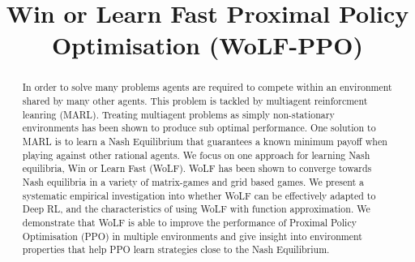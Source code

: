 \documentclass[conference]{IEEEtran}
\begin{document}
\setlength{\intextsep}{0.5ex}

\title{Win or Learn Fast Proximal Policy Optimisation (WoLF-PPO)}

\author{
\and
{}
\and
{}
}

\maketitle

\begin{abstract}
    In order to solve many problems agents are required to compete within an environment shared by many other agents. This problem is tackled by multiagent reinforcment leanring (MARL). Treating multiagent problems as simply non-stationary environments has been shown to produce sub optimal performance. One solution to MARL is to learn a Nash Equilibrium that guarantees a known minimum payoff when playing against other rational agents. We focus on one approach for learning Nash equilibria, Win or Learn Fast (WoLF). WoLF has been shown to converge towards Nash equilibria in a variety of matrix-games and grid based games. We present a systematic empirical investigation into whether WoLF can be effectively adapted to Deep RL, and the characteristics of using WoLF with function approximation. We demonstrate that WoLF is able to improve the performance of Proximal Policy Optimisation (PPO) in multiple environments and give insight into environment properties that help PPO learn strategies close to the Nash Equilibrium.
\end{abstract}
\end{document}
